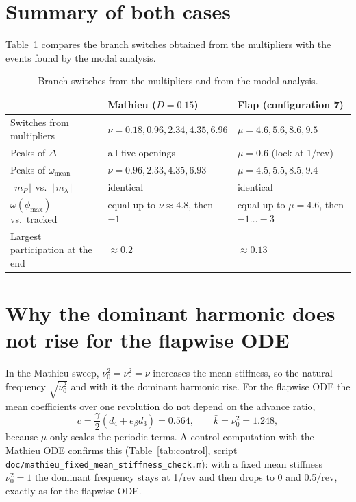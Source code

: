\documentclass[11pt,a4paper]{article}
\begin{document}
\section{Summary of both cases}
Table~\ref{tab:summary} compares the branch switches obtained from the multipliers with
the events found by the modal analysis.

\begin{table}[htbp]
  \centering
  \caption{Branch switches from the multipliers and from the modal analysis.}
  \label{tab:summary}
  \small
  \begin{tabular}{p{}p{}p{}}
    \toprule
     & Mathieu ($D = 0.15$) & Flap (configuration 7) \\
    \midrule
    Switches from multipliers & $\nu = 0.18, 0.96, 2.34, 4.35, 6.96$ & $\mu = 4.6, 5.6, 8.6, 9.5$ \\
    Peaks of $\Delta$          & all five openings                     & $\mu = 0.6$ (lock at 1/rev) \\
    Peaks of $\omega_\text{mean}$ & $\nu = 0.96, 2.33, 4.35, 6.93$     & $\mu = 4.5, 5.5, 8.5, 9.4$ \\
    $\lfloor m_P\rfloor$ vs.\ $\lfloor m_\lambda\rfloor$ & identical & identical \\
    $\omega(\phi_\text{max})$ vs.\ tracked & equal up to $\nu \approx 4.8$, then $-1$ & equal up to $\mu = 4.6$, then $-1 \dots -3$ \\
    Largest participation at the end & $\approx 0.2$ & $\approx 0.13$ \\
    \bottomrule
  \end{tabular}
\end{table}

\section{Why the dominant harmonic does not rise for the flapwise ODE}
In the Mathieu sweep, $\nu_0^2 = \nu_c^2 = \nu$ increases the mean stiffness, so the
natural frequency $\sqrt{\nu_0^2}$ and with it the dominant harmonic rise. For the flapwise
ODE the mean coefficients over one revolution do not depend on the advance ratio,
\begin{equation}
  \bar c = \frac{\gamma}{2}\left(d_4 + e_\beta d_3\right) = 0.564, \qquad
  \bar k = \nu_0^2 = 1.248,
\end{equation}
because $\mu$ only scales the periodic terms. A control computation with the Mathieu ODE
confirms this (Table~\ref{tab:control}, script
\texttt{doc/mathieu\_fixed\_mean\_stiffness\_check.m}): with a fixed mean stiffness
$\nu_0^2 = 1$ the dominant frequency stays at 1/rev and then drops to 0 and 0.5/rev,
exactly as for the flapwise ODE.
\end{document}
